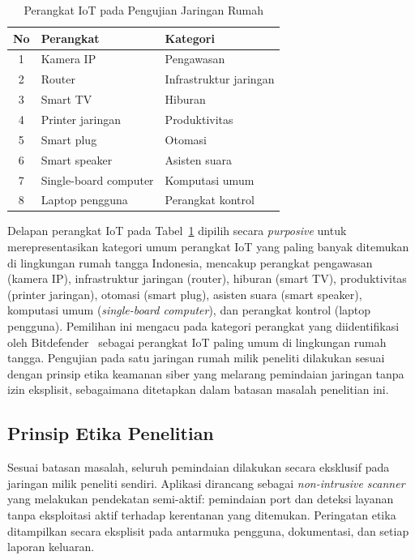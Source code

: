 \begin{table}[ht]
    \centering
    \caption{Perangkat IoT pada Pengujian Jaringan Rumah}
    \label{tab:perangkat}
    \begin{tabular}{|c|l|l|}
        \hline
        \textbf{No} & \textbf{Perangkat} & \textbf{Kategori} \\
        \hline
        1 & Kamera IP & Pengawasan \\
        2 & Router & Infrastruktur jaringan \\
        3 & Smart TV & Hiburan \\
        4 & Printer jaringan & Produktivitas \\
        5 & Smart plug & Otomasi \\
        6 & Smart speaker & Asisten suara \\
        7 & Single-board computer & Komputasi umum \\
        8 & Laptop pengguna & Perangkat kontrol \\
        \hline
    \end{tabular}
\end{table}

Delapan perangkat IoT pada Tabel~\ref{tab:perangkat} dipilih secara
\textit{purposive} untuk merepresentasikan kategori umum perangkat IoT yang
paling banyak ditemukan di lingkungan rumah tangga Indonesia, mencakup
perangkat pengawasan (kamera IP), infrastruktur jaringan (router), hiburan
(smart TV), produktivitas (printer jaringan), otomasi (smart plug), asisten
suara (smart speaker), komputasi umum (\textit{single-board computer}), dan
perangkat kontrol (laptop pengguna). Pemilihan ini mengacu pada kategori
perangkat yang diidentifikasi oleh Bitdefender~\cite{b3} sebagai perangkat IoT
paling umum di lingkungan rumah tangga. Pengujian pada satu jaringan rumah
milik peneliti dilakukan sesuai dengan prinsip etika keamanan siber yang
melarang pemindaian jaringan tanpa izin eksplisit, sebagaimana ditetapkan dalam
batasan masalah penelitian ini.

\subsection{Prinsip Etika Penelitian}
Sesuai batasan masalah, seluruh pemindaian dilakukan secara eksklusif
pada jaringan milik peneliti sendiri. Aplikasi dirancang sebagai
\textit{non-intrusive scanner} yang melakukan pendekatan semi-aktif:
pemindaian port dan deteksi layanan tanpa eksploitasi aktif terhadap
kerentanan yang ditemukan. Peringatan etika ditampilkan secara eksplisit
pada antarmuka pengguna, dokumentasi, dan setiap laporan keluaran.

